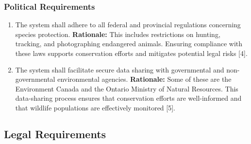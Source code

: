 \documentclass[]{article}
\begin{document}
\subsubsection{Political Requirements}
\label{ssub:political_requirements}
\begin{enumerate}[{CP-P}1. ]
	 \item The system shall adhere to all federal and provincial regulations concerning species protection. 
    \newline \textbf{Rationale:} This includes restrictions on hunting, tracking, and photographing endangered animals. Ensuring compliance with these laws supports conservation efforts and mitigates potential legal risks [4].

      \item The system shall facilitate secure data sharing with governmental and non-governmental environmental agencies.
    \newline \textbf{Rationale:} Some of these are the Environment Canada and the Ontario Ministry of Natural Resources. This data-sharing process ensures that conservation efforts are well-informed and that wildlife populations are effectively monitored [5].
\end{enumerate}


\subsection{Legal Requirements}
\label{sub:legal_requirements}
\end{document}
